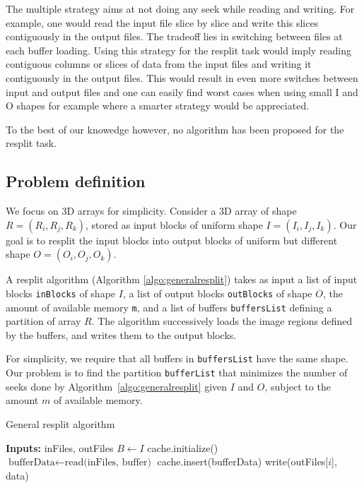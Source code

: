 \documentclass[conference]{IEEEtran}
\begin{document}
The multiple strategy aims at not doing any seek while reading and writing. For
example, one would read the input file slice by slice and write this slices
contiguously in the output files. The tradeoff lies in switching between files
at each buffer loading. Using this strategy for the resplit task would imply
reading contiguous columns or slices of data from the input files and writing it
contiguously in the output files. This would result in even more switches
between input and output files and one can easily find worst cases when using
small I and O shapes for example where a smarter strategy would be appreciated.

To the best of our knowedge however, no algorithm has been proposed for the
resplit task.

\subsection{Problem definition}
We focus on 3D arrays for simplicity. Consider a 3D array of shape $R =
(R_i, R_j, R_k)$, stored as input blocks of uniform shape $I =
(I_i, I_j, I_k)$. Our goal is to resplit the input blocks into output
blocks of uniform but different shape $O = (O_i, O_j, O_k)$.

A resplit algorithm (Algorithm \ref{algo:generalresplit}) takes as input a
list of input blocks \texttt{inBlocks} of shape $I$, a list of output
blocks \texttt{outBlocks} of shape $O$, the amount of available memory
\texttt{m}, and a list of buffers \texttt{buffersList} defining a partition
of array $R$. The algorithm successively loads the image regions defined by
the buffers, and writes them to the output blocks.

For simplicity, we require that all buffers in \texttt{buffersList} have
the same shape. Our problem is to find the partition \texttt{bufferList}
that minimizes the number of seeks done by Algorithm~\ref{algo:generalresplit}
given $I$ and $O$, subject to the amount $m$ of available memory.

\begin{algorithm}[H]
  \caption{General resplit algorithm}
  \label{algo:generalresplit}
  \begin{algorithmic}
    \STATE \textbf{Inputs:} inFiles, outFiles
    \STATE $B \leftarrow I$
    \STATE cache.initialize()
      \STATE $\textrm{bufferData} \leftarrow \textrm{read(inFiles, buffer)}$
      \STATE cache.insert(bufferData)
        \STATE write(outFiles[$i$], data)
      \ENDFOR
    \ENDFOR

  \end{algorithmic}
\end{algorithm}
\end{document}
